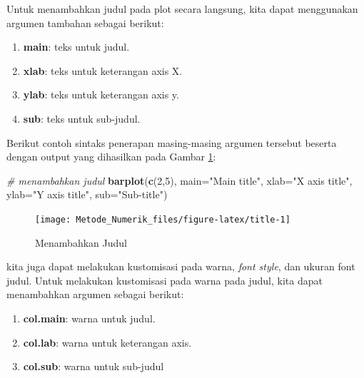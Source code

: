 \documentclass[]{book}
\newenvironment{Shaded}{\begin{snugshade}}{\end{snugshade}}
\newcommand{\CommentTok}[1]{\textcolor[rgb]{0.56,0.35,0.01}{\textit{#1}}}
\newcommand{\DataTypeTok}[1]{\textcolor[rgb]{0.13,0.29,0.53}{#1}}
\newcommand{\DecValTok}[1]{\textcolor[rgb]{0.00,0.00,0.81}{#1}}
\newcommand{\KeywordTok}[1]{\textcolor[rgb]{0.13,0.29,0.53}{\textbf{#1}}}
\newcommand{\NormalTok}[1]{#1}
\newcommand{\StringTok}[1]{\textcolor[rgb]{0.31,0.60,0.02}{#1}}
\providecommand{\tightlist}{%
  \setlength{\itemsep}{0pt}\setlength{\parskip}{0pt}}
\theoremstyle{definition}
\theoremstyle{definition}
\theoremstyle{definition}
\theoremstyle{remark}
\begin{document}
Untuk menambahkan judul pada plot secara langsung, kita dapat menggunakan argumen tambahan sebagai berikut:

\begin{enumerate}
\def\labelenumi{\alph{enumi}.}
\tightlist
\item
  \textbf{main}: teks untuk judul.
\item
  \textbf{xlab}: teks untuk keterangan axis X.
\item
  \textbf{ylab}: teks untuk keterangan axis y.
\item
  \textbf{sub}: teks untuk sub-judul.
\end{enumerate}

Berikut contoh sintaks penerapan masing-masing argumen tersebut beserta dengan output yang dihasilkan pada Gambar \ref{fig:title}:

\begin{Shaded}
\begin{Highlighting}[]
\CommentTok{# menambahkan judul}
\KeywordTok{barplot}\NormalTok{(}\KeywordTok{c}\NormalTok{(}\DecValTok{2}\NormalTok{,}\DecValTok{5}\NormalTok{), }\DataTypeTok{main=}\StringTok{"Main title"}\NormalTok{,}
        \DataTypeTok{xlab=}\StringTok{"X axis title"}\NormalTok{,}
        \DataTypeTok{ylab=}\StringTok{"Y axis title"}\NormalTok{,}
        \DataTypeTok{sub=}\StringTok{"Sub-title"}\NormalTok{)}
\end{Highlighting}
\end{Shaded}

\begin{figure}

{\centering \texttt{[image: Metode\_Numerik\_files/figure-latex/title-1]} 

}

\caption{Menambahkan Judul}\label{fig:title}
\end{figure}

kita juga dapat melakukan kustomisasi pada warna, \emph{font style}, dan ukuran font judul. Untuk melakukan kustomisasi pada warna pada judul, kita dapat menambahkan argumen sebagai berikut:

\begin{enumerate}
\def\labelenumi{\alph{enumi}.}
\tightlist
\item
  \textbf{col.main}: warna untuk judul.
\item
  \textbf{col.lab}: warna untuk keterangan axis.
\item
  \textbf{col.sub}: warna untuk sub-judul
\end{enumerate}
\end{document}
